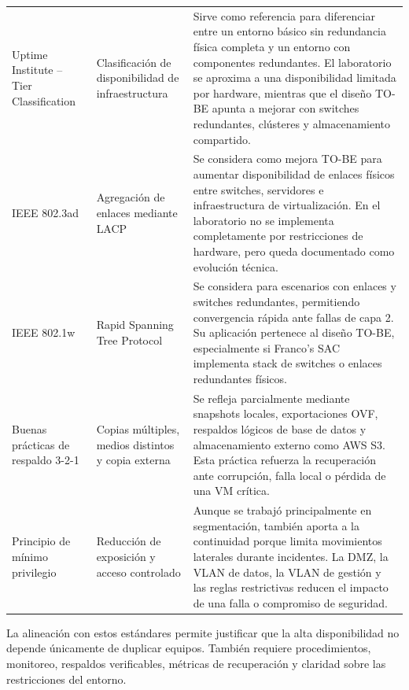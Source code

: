 \documentclass[11pt, a4paper, oneside]{report}
\begin{document}
\begin{xltabular}{\textwidth}{@{}|L{3.6cm}|L{4.2cm}|X|@{}}
{\small Uptime Institute -- Tier Classification} &
{\small Clasificación de disponibilidad de infraestructura} &
{\small Sirve como referencia para diferenciar entre un entorno básico sin redundancia física completa y un entorno con componentes redundantes. El laboratorio se aproxima a una disponibilidad limitada por hardware, mientras que el diseño TO-BE apunta a mejorar con switches redundantes, clústeres y almacenamiento compartido.} \\ \hline

{\small IEEE 802.3ad\newline \cite{ieee8023ad}} &
{\small Agregación de enlaces mediante LACP} &
{\small Se considera como mejora TO-BE para aumentar disponibilidad de enlaces físicos entre switches, servidores e infraestructura de virtualización. En el laboratorio no se implementa completamente por restricciones de hardware, pero queda documentado como evolución técnica.} \\ \hline

{\small IEEE 802.1w\newline \cite{ieee8021w}} &
{\small Rapid Spanning Tree Protocol} &
{\small Se considera para escenarios con enlaces y switches redundantes, permitiendo convergencia rápida ante fallas de capa 2. Su aplicación pertenece al diseño TO-BE, especialmente si Franco's SAC implementa stack de switches o enlaces redundantes físicos.} \\ \hline

{\small Buenas prácticas de respaldo 3-2-1} &
{\small Copias múltiples, medios distintos y copia externa} &
{\small Se refleja parcialmente mediante snapshots locales, exportaciones OVF, respaldos lógicos de base de datos y almacenamiento externo como AWS S3. Esta práctica refuerza la recuperación ante corrupción, falla local o pérdida de una VM crítica.} \\ \hline

{\small Principio de mínimo privilegio} &
{\small Reducción de exposición y acceso controlado} &
{\small Aunque se trabajó principalmente en segmentación, también aporta a la continuidad porque limita movimientos laterales durante incidentes. La DMZ, la VLAN de datos, la VLAN de gestión y las reglas restrictivas reducen el impacto de una falla o compromiso de seguridad.} \\ \hline

\end{xltabular}

\normalsize

La alineación con estos estándares permite justificar que la alta disponibilidad no depende únicamente de duplicar equipos. También requiere procedimientos, monitoreo, respaldos verificables, métricas de recuperación y claridad sobre las restricciones del entorno.
\end{document}
